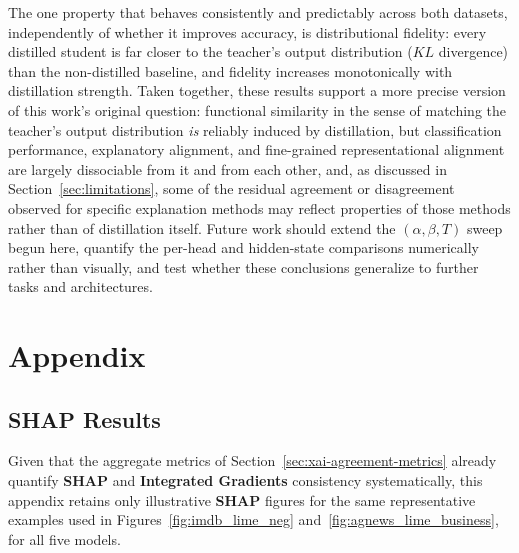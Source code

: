 \documentclass[conference]{IEEEtran}
\begin{document}
The one property that behaves consistently and predictably across both datasets, independently of whether it improves accuracy, is distributional fidelity: every distilled student is far closer to the teacher's output distribution ($KL$ divergence) than the non-distilled baseline, and fidelity increases monotonically with distillation strength. Taken together, these results support a more precise version of this work's original question: functional similarity in the sense of matching the teacher's output distribution \emph{is} reliably induced by distillation, but classification performance, explanatory alignment, and fine-grained representational alignment are largely dissociable from it and from each other, and, as discussed in Section~\ref{sec:limitations}, some of the residual agreement or disagreement observed for specific explanation methods may reflect properties of those methods rather than of distillation itself. Future work should extend the $(\alpha,\beta,T)$ sweep begun here, quantify the per-head and hidden-state comparisons numerically rather than visually, and test whether these conclusions generalize to further tasks and architectures.




\clearpage
\section{Appendix}

\subsection{\textbf{SHAP} Results}
\label{anexo:shap}

Given that the aggregate metrics of Section~\ref{sec:xai-agreement-metrics} already quantify \textbf{SHAP} and \textbf{Integrated Gradients} consistency systematically, this appendix retains only illustrative \textbf{SHAP} figures for the same representative examples used in Figures~\ref{fig:imdb_lime_neg} and~\ref{fig:agnews_lime_business}, for all five models.
\end{document}
